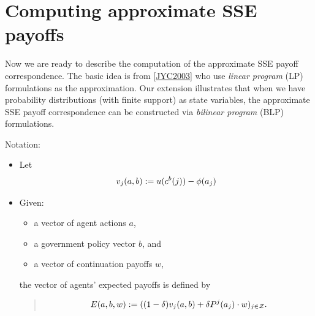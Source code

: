 \documentclass[a4paper,10pt,english]{sphinxmanual}
\begin{document}
\begin{DUlineblock}{0em}
\item[] 
\item[] 
\item[] 
\end{DUlineblock}


\chapter{Computing approximate SSE payoffs}
\label{payoff_compute:computing-approximate-sse-payoffs}\label{payoff_compute::doc}
Now we are ready to describe the computation of the approximate SSE payoff correspondence. The basic idea is from {\hyperref[payoff_compute:jyc2003]{{[}JYC2003{]}}} who use \emph{linear program} (LP) formulations as the approximation. Our extension illustrates that when we have probability distributions (with finite support) as state variables, the approximate SSE payoff correspondence can be constructed via \emph{bilinear program} (BLP) formulations.

Notation:
\begin{itemize}
\item {} 
Let
\begin{gather}
\begin{split}v_j(a,b) := u(c^b(j))-\phi(a_j)\end{split}\notag
\end{gather}
\item {} 
Given:
\begin{itemize}
\item {} 
a vector of agent actions \(a\),

\item {} 
a government policy vector \(b\), and

\item {} 
a vector of continuation payoffs \(w\),

\end{itemize}

the vector of agents' expected payoffs is defined by
\begin{quote}
\begin{gather}
\begin{split}E(a,b,w):=((1-\delta)v_j(a,b)+\delta P^j(a_j)\cdot w)_{j\in \mathcal{Z}}.\end{split}\notag
\end{gather}\end{quote}

\end{itemize}
\end{document}
